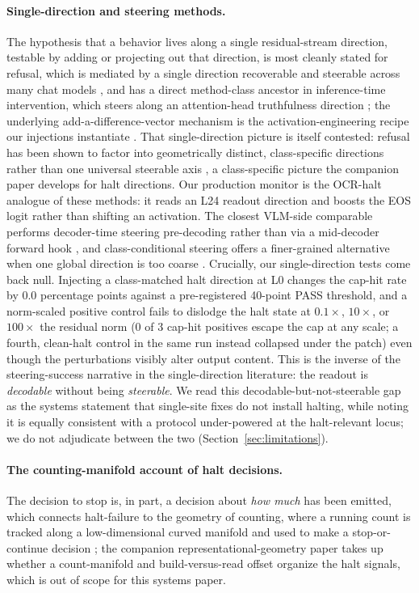 \documentclass[11pt]{article}
\begin{document}
\paragraph{Single-direction and steering methods.}
The hypothesis that a behavior lives along a single residual-stream direction, testable
by adding or projecting out that direction, is most cleanly stated for refusal, which is
mediated by a single direction recoverable and steerable across many chat models
\citep{arditi2024refusal}, and has a direct method-class ancestor in inference-time
intervention, which steers along an attention-head truthfulness direction
\citep{li2023iti}; the underlying add-a-difference-vector mechanism is the activation-engineering
recipe our injections instantiate \citep{turner2023activationengineering}. That
single-direction picture is itself contested: refusal has been shown to factor into
geometrically distinct, class-specific directions rather than one universal steerable axis
\citep{joad2026morethanrefusal}, a class-specific picture the companion paper develops for
halt directions. Our production monitor is the OCR-halt analogue of these methods: it reads
an L24 readout direction and boosts the EOS logit rather than shifting an activation. The
closest VLM-side comparable performs decoder-time steering pre-decoding rather than via a
mid-decoder forward hook \citep{steervlm2025}, and class-conditional steering offers a
finer-grained alternative when one global direction is too coarse \citep{yin2026dmas}.
Crucially, our single-direction tests come back null. Injecting a class-matched halt
direction at L0 changes the cap-hit rate by 0.0 percentage points against a pre-registered
40-point PASS threshold, and a norm-scaled positive control fails to dislodge the halt
state at $0.1\times$, $10\times$, or $100\times$ the residual norm (0 of 3 cap-hit
positives escape the cap at any scale; a fourth, clean-halt control in the same run instead
collapsed under the patch) even though the perturbations visibly alter output content. This
is the inverse of the steering-success narrative in the single-direction literature: the
readout is \emph{decodable} without being \emph{steerable}. We read this
decodable-but-not-steerable gap as the systems statement that single-site fixes do not
install halting, while noting it is equally consistent with a protocol under-powered at the
halt-relevant locus; we do not adjudicate between the two (Section~\ref{sec:limitations}).

\paragraph{The counting-manifold account of halt decisions.}
The decision to stop is, in part, a decision about \emph{how much} has been emitted, which
connects halt-failure to the geometry of counting, where a running count is tracked along a
low-dimensional curved manifold and used to make a stop-or-continue decision
\citep{gurnee2026countmfd}; the companion representational-geometry paper takes up whether a
count-manifold and build-versus-read offset organize the halt signals, which is out of
scope for this systems paper.
\end{document}
